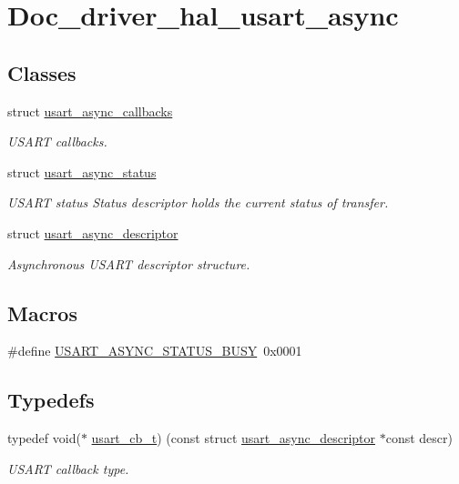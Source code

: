 \hypertarget{group__doc__driver__hal__usart__async}{}\section{Doc\+\_\+driver\+\_\+hal\+\_\+usart\+\_\+async}
\label{group__doc__driver__hal__usart__async}
\subsection*{Classes}
\begin{DoxyCompactItemize}
\item 
struct \hyperlink{structusart__async__callbacks}{usart\+\_\+async\+\_\+callbacks}
\begin{DoxyCompactList}\small\item\em U\+S\+A\+RT callbacks. \end{DoxyCompactList}\item 
struct \hyperlink{structusart__async__status}{usart\+\_\+async\+\_\+status}
\begin{DoxyCompactList}\small\item\em U\+S\+A\+RT status Status descriptor holds the current status of transfer. \end{DoxyCompactList}\item 
struct \hyperlink{structusart__async__descriptor}{usart\+\_\+async\+\_\+descriptor}
\begin{DoxyCompactList}\small\item\em Asynchronous U\+S\+A\+RT descriptor structure. \end{DoxyCompactList}\end{DoxyCompactItemize}
\subsection*{Macros}
\begin{DoxyCompactItemize}
\item 
\#define \hyperlink{group__doc__driver__hal__usart__async_ga6991341cd882eb58bccc1de667d1b336}{U\+S\+A\+R\+T\+\_\+\+A\+S\+Y\+N\+C\+\_\+\+S\+T\+A\+T\+U\+S\+\_\+\+B\+U\+SY}~0x0001
\end{DoxyCompactItemize}
\subsection*{Typedefs}
\begin{DoxyCompactItemize}
\item 
typedef void($\ast$ \hyperlink{group__doc__driver__hal__usart__async_ga430e4080a53e1f39c4d46da01200f633}{usart\+\_\+cb\+\_\+t}) (const struct \hyperlink{structusart__async__descriptor}{usart\+\_\+async\+\_\+descriptor} $\ast$const descr)
\begin{DoxyCompactList}\small\item\em U\+S\+A\+RT callback type. \end{DoxyCompactList}\end{DoxyCompactItemize}
